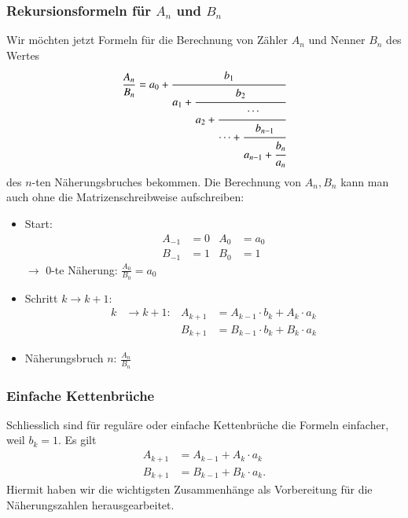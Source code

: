 \subsubsection{Rekursionsformeln für $A_n$ und $B_n$}
Wir möchten jetzt Formeln für die Berechnung von Zähler $A_n$ und Nenner $B_n$
des Wertes
\begin{align*}
\frac{A_n}{B_n}
=
a_0 + \cfrac{b_1}{a_1+\cfrac{b_2}{a_2+\cfrac{\cdots}{\cdots+\cfrac{b_{n-1}}{a_{n-1} + \cfrac{b_n}{a_n}}}}}
\end{align*}
des $n$-ten Näherungsbruches bekommen.
Die Berechnung von $A_n, B_n$ kann man auch ohne die Matrizenschreibweise
aufschreiben:
\begin{itemize}
\item Start:
\begin{align*}
A_{-1} &= 0		&		A_0 &= a_0 \\
B_{-1} &= 1		&		B_0 &= 1 
\end{align*}
$\rightarrow$ 0-te Näherung: $\displaystyle\frac{A_0}{B_0} = a_0$
\item Schritt $k\to k+1$:
\[
\begin{aligned}
k &\rightarrow k + 1:
&
A_{k+1} &= A_{k-1} \cdot b_k + A_k \cdot a_k \\
&&
B_{k+1} &= B_{k-1} \cdot b_k + B_k \cdot a_k
\end{aligned}
\]
\item
Näherungsbruch $n$: \qquad$\displaystyle\frac{A_n}{B_n}$
\end{itemize}
\subsubsection{Einfache Kettenbrüche}
Schliesslich sind für reguläre oder einfache Kettenbrüche die Formeln
einfacher, weil $b_k = 1$.
Es gilt
\begin{align*}
A_{k+1} &= A_{k-1} + A_k \cdot a_k \\
B_{k+1} &= B_{k-1} + B_k \cdot a_k.
\end{align*}
Hiermit haben wir die wichtigsten Zusammenhänge als Vorbereitung für die Näherungszahlen herausgearbeitet.
